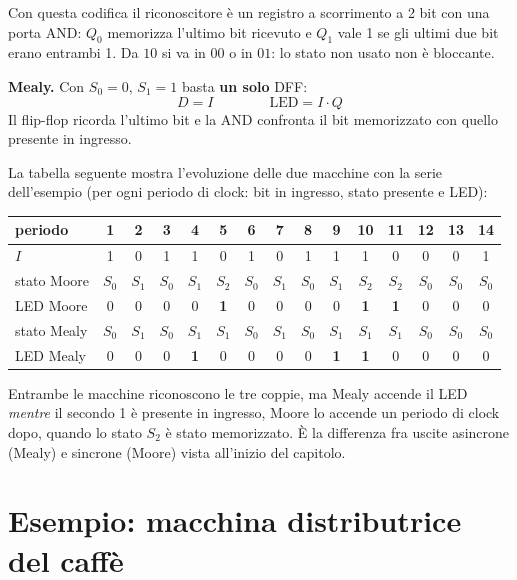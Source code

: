 \noindent Con questa codifica il riconoscitore è un registro a scorrimento a 2 bit con una
porta AND: $Q_0$ memorizza l'ultimo bit ricevuto e $Q_1$ vale 1 se gli ultimi due bit erano
entrambi 1. Da $10$ si va in $00$ o in $01$: lo stato non usato non è bloccante.

\medskip
\noindent\textbf{Mealy.} Con $S_0=0$, $S_1=1$ basta \textbf{un solo} DFF:
\[
D = I \qquad\qquad \text{LED} = I\cdot Q
\]
Il flip-flop ricorda l'ultimo bit e la AND confronta il bit memorizzato con quello
presente in ingresso.

\medskip
\noindent La tabella seguente mostra l'evoluzione delle due macchine con la serie
dell'esempio (per ogni periodo di clock: bit in ingresso, stato presente e LED):

\begin{center}
\small
\setlength{\tabcolsep}{4pt}
\begin{tabular}{l|cccccccccccccc}
\toprule
periodo & 1 & 2 & 3 & 4 & 5 & 6 & 7 & 8 & 9 & 10 & 11 & 12 & 13 & 14 \\
\midrule
$I$ & 1 & 0 & 1 & 1 & 0 & 1 & 0 & 1 & 1 & 1 & 0 & 0 & 0 & 1 \\
\midrule
stato Moore & $S_0$ & $S_1$ & $S_0$ & $S_1$ & $S_2$ & $S_0$ & $S_1$ & $S_0$ & $S_1$ & $S_2$ & $S_2$ & $S_0$ & $S_0$ & $S_0$ \\
LED Moore & 0 & 0 & 0 & 0 & \textbf{1} & 0 & 0 & 0 & 0 & \textbf{1} & \textbf{1} & 0 & 0 & 0 \\
\midrule
stato Mealy & $S_0$ & $S_1$ & $S_0$ & $S_1$ & $S_1$ & $S_0$ & $S_1$ & $S_0$ & $S_1$ & $S_1$ & $S_1$ & $S_0$ & $S_0$ & $S_0$ \\
LED Mealy & 0 & 0 & 0 & \textbf{1} & 0 & 0 & 0 & 0 & \textbf{1} & \textbf{1} & 0 & 0 & 0 & 0 \\
\bottomrule
\end{tabular}
\end{center}

\noindent Entrambe le macchine riconoscono le tre coppie, ma Mealy accende il LED
\emph{mentre} il secondo 1 è presente in ingresso, Moore lo accende un periodo di clock
dopo, quando lo stato $S_2$ è stato memorizzato. È la differenza fra uscite asincrone
(Mealy) e sincrone (Moore) vista all'inizio del capitolo.

\section{Esempio: macchina distributrice del caffè}

